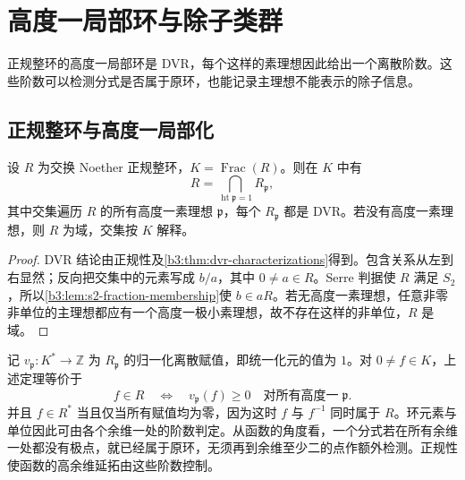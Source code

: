
\section{高度一局部环与除子类群}
\label{b3:sec:2003}

正规整环的高度一局部环是 DVR，每个这样的素理想因此给出一个离散阶数。这些阶数可以检测分式是否属于原环，也能记录主理想不能表示的除子信息。


%
%

\subsection{正规整环与高度一局部化}
\label{b3:subsec:2003:01}

\begin{theorem}\label{b3:thm:normal-height-one-intersection}
	设 \(R\) 为交换 Noether 正规整环，\(K=\operatorname{Frac}(R)\)。则在 \(K\) 中有
	\[
		R=\bigcap_{\operatorname{ht}\mathfrak p=1}R_{\mathfrak p},
	\]
	其中交集遍历 \(R\) 的所有高度一素理想 \(\mathfrak p\)，每个 \(R_{\mathfrak p}\) 都是 DVR。若没有高度一素理想，则 \(R\) 为域，交集按 \(K\) 解释。
\end{theorem}
\begin{proof}
	DVR 结论由正规性及\cref{b3:thm:dvr-characterizations}得到。包含关系从左到右显然；反向把交集中的元素写成 \(b/a\)，其中 \(0\ne a\in R\)。Serre 判据使 \(R\) 满足 \(S_2\)，所以\cref{b3:lem:s2-fraction-membership}使 \(b\in aR\)。若无高度一素理想，任意非零非单位的主理想都应有一个高度一极小素理想，故不存在这样的非单位，\(R\) 是域。
\end{proof}

记 \(v_{\mathfrak p}:K^*\rightarrow\mathbb Z\) 为 \(R_{\mathfrak p}\) 的归一化离散赋值，即统一化元的值为 \(1\)。对 \(0\ne f\in K\)，上述定理等价于
\[
	f\in R\quad\Longleftrightarrow\quad v_{\mathfrak p}(f)\ge0 \quad\text{对所有高度一}\;\mathfrak p.
\]
并且 \(f\in R^*\) 当且仅当所有赋值均为零，因为这时 \(f\) 与 \(f^{-1}\) 同时属于 \(R\)。环元素与单位因此可由各个余维一处的阶数判定。从函数的角度看，一个分式若在所有余维一处都没有极点，就已经属于原环，无须再到余维至少二的点作额外检测。正规性使函数的高余维延拓由这些阶数控制。


